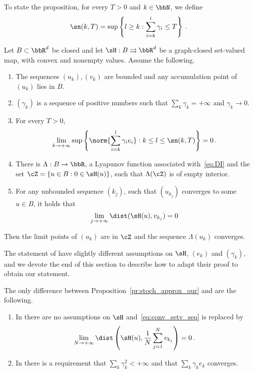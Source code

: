 To state the proposition, for every $T>0$ and $k \in \bbN$, we define
\begin{equation*}
  \sn(k, T) = \sup \left\{ l \geq k: \sum_{i=k}^l \gamma_i \leq T \right\}\, .
\end{equation*}

\begin{proposition}\label{pr:stoch_approx_our}
  Let $B \subset \bbR^d$ be closed and let $\sH: B \rightrightarrows \bbR^d$ be a graph-closed set-valued map, with convex and nonempty values. Assume the following.
  \begin{enumerate}[label=\roman*)]
    \item The sequences $(u_k), (v_k)$ are bounded and any accumulation point of $(u_k)$ lies in $B$.
    \item $(\gamma_k)$ is a sequence of positive numbers such that $\sum_{k} \gamma_k = +\infty$ and $\gamma_k \rightarrow 0$.
    \item\label{hyp:perturb_zero} For every $T>0$, 
    \begin{equation*}
     \lim_{k \rightarrow + \infty} \sup\left\{ \norm{\sum_{i=k}^l \gamma_i e_i} : k \leq l \leq \sn(k,T)\right\}  = 0 \, .
    \end{equation*}
    \item \label{hyp:drus_lyap} There is $\Lambda : B \rightarrow \bbR$, a Lyapunov function associated with~\eqref{eq:DI} and the set $\cZ = \{u \in B: 0 \in \sH(u)\}$, such that $\Lambda(\cZ)$ is of empty interior.
     \item\label{hyp:drus_conv} For any unbounded sequence $(k_j)$, such that $(u_{k_j})$ converges to some $u\in B$, it holds that 
    \begin{equation}\label{eq:conv_setv_seq}
     \lim_{j \rightarrow + \infty} \dist(\sH(u), v_{k_j}) =   0
    \end{equation}
   \end{enumerate}
Then the limit points of $(u_k)$ are in $\cZ$ and the sequence $\Lambda(u_k)$ converges.
\end{proposition}
The statement of \cite[Theorem 3.2]{dav-dru-kak-lee-19} have slightly different assumptions on $\sH$, $(e_k)$ and $(\gamma_k)$, and we devote the end of this section to describe how to adapt their proof to obtain our statement.

 The only difference between Proposition~\ref{pr:stoch_approx_our} and \cite[Theorem 3.2]{dav-dru-kak-lee-19} are the following.

\begin{enumerate}
  \item In \cite[Theorem 3.2]{dav-dru-kak-lee-19} there are no assumptions on $\sH$ and~\eqref{eq:conv_setv_seq} is replaced by 
  \begin{equation*}
   \lim_{N \rightarrow + \infty} \dist\left(\sH(u), \frac{1}{N} \sum_{j=1}^N v_{k_j}\right) = 0\, .
  \end{equation*}
  \item In \cite[Theorem 3.2]{dav-dru-kak-lee-19} there is a requirement that $\sum_k \gamma_k^2 < + \infty$ and that $\sum_{k}\gamma_k e_k$ converges.
\end{enumerate}


